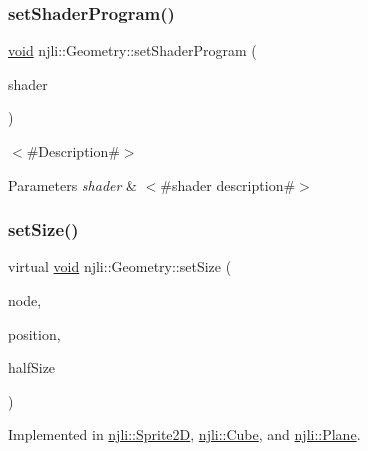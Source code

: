 \mbox{\label{classnjli_1_1_geometry_a49e8cb2aeb028d46a2ec9e4b45b7bb6f}} 
\subsubsection{\texorpdfstring{set\+Shader\+Program()}{setShaderProgram()}}
{\footnotesize\ttfamily \mbox{\hyperlink{_thread_8h_af1e856da2e658414cb2456cb6f7ebc66}{void}} njli\+::\+Geometry\+::set\+Shader\+Program (\begin{DoxyParamCaption}\item[{\mbox{\hyperlink{classnjli_1_1_shader_program}{Shader\+Program}} $\ast$}]{shader }\end{DoxyParamCaption})}

$<$\#\+Description\#$>$


\begin{DoxyParams}{Parameters}
{\em shader} & $<$\#shader description\#$>$ \\
\hline
\end{DoxyParams}
\mbox{\label{classnjli_1_1_geometry_a64c12722f84add665776c2b9400108fd}} 
\subsubsection{\texorpdfstring{set\+Size()}{setSize()}}
{\footnotesize\ttfamily virtual \mbox{\hyperlink{_thread_8h_af1e856da2e658414cb2456cb6f7ebc66}{void}} njli\+::\+Geometry\+::set\+Size (\begin{DoxyParamCaption}\item[{\mbox{\hyperlink{classnjli_1_1_node}{Node}} $\ast$}]{node,  }\item[{const bt\+Vector3 \&}]{position,  }\item[{const \mbox{\hyperlink{_util_8h_a5f6906312a689f27d70e9d086649d3fd}{f32}}}]{half\+Size }\end{DoxyParamCaption})\hspace{0.3cm}{\ttfamily [pure virtual]}}



Implemented in \mbox{\hyperlink{classnjli_1_1_sprite2_d_a318f37bf46314d96ce9c70794cf6125a}{njli\+::\+Sprite2D}}, \mbox{\hyperlink{classnjli_1_1_cube_a935f8c1119991d17858a3982c33912b6}{njli\+::\+Cube}}, and \mbox{\hyperlink{classnjli_1_1_plane_a69ac7f253c3a2a068f9fd20526dbfa3d}{njli\+::\+Plane}}.

